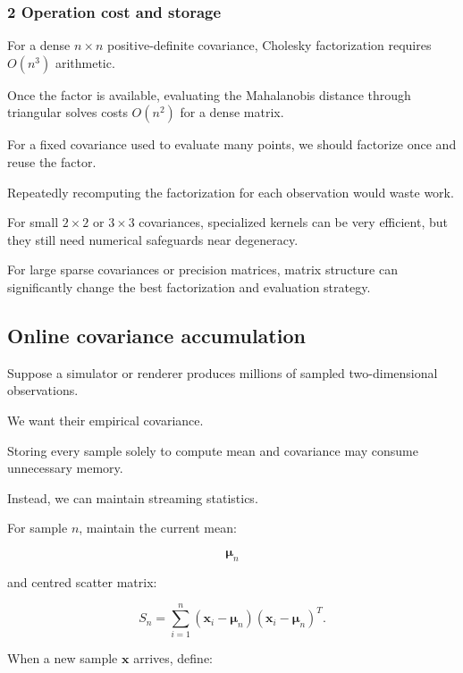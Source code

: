 \subsubsection{2 Operation cost and storage}\label{02-foundations-ii-ch031-operation-cost-and-storage}

\hypertarget{02-foundations-ii-ch031-operation-cost-and-storage}{}

For a dense \(n\times n\) positive-definite covariance, Cholesky factorization requires \(O(n^3)\) arithmetic.

Once the factor is available, evaluating the Mahalanobis distance through triangular solves costs \(O(n^2)\) for a dense matrix.

For a fixed covariance used to evaluate many points, we should factorize once and reuse the factor.

Repeatedly recomputing the factorization for each observation would waste work.

For small \(2\times2\) or \(3\times3\) covariances, specialized kernels can be very efficient, but they still need numerical safeguards near degeneracy.

For large sparse covariances or precision matrices, matrix structure can significantly change the best factorization and evaluation strategy.

\subsection{Online covariance accumulation}\label{02-foundations-ii-ch031-online-covariance-accumulation}

\hypertarget{02-foundations-ii-ch031-online-covariance-accumulation}{}

Suppose a simulator or renderer produces millions of sampled two-dimensional observations.

We want their empirical covariance.

Storing every sample solely to compute mean and covariance may consume unnecessary memory.

Instead, we can maintain streaming statistics.

For sample \(n\), maintain the current mean:

\[
 \boldsymbol\mu_n
\]

and centred scatter matrix:

\[
 S_n= \sum_{i=1}^{n} (\mathbf x_i-\boldsymbol\mu_n) (\mathbf x_i-\boldsymbol\mu_n)^T.
\]

When a new sample \(\mathbf x\) arrives, define:

